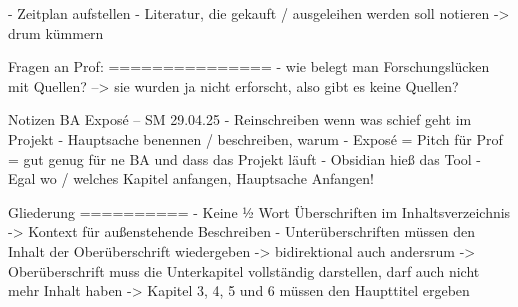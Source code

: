 - Zeitplan aufstellen
- Literatur, die gekauft / ausgeleihen werden soll notieren
  -> drum kümmern


Fragen an Prof:
===============
- wie belegt man Forschungslücken mit Quellen?
  --> sie wurden ja nicht erforscht, also gibt es keine Quellen?


Notizen BA Exposé – SM 29.04.25
-	Reinschreiben wenn was schief geht im Projekt
-	Hauptsache benennen / beschreiben, warum
-	Exposé = Pitch für Prof = gut genug für ne BA und dass das Projekt läuft
-	Obsidian hieß das Tool
-	Egal wo / welches Kapitel anfangen, Hauptsache Anfangen!

Gliederung
==========
-	Keine ½ Wort Überschriften im Inhaltsverzeichnis
    -> Kontext für außenstehende Beschreiben
-	Unterüberschriften müssen den Inhalt der Oberüberschrift wiedergeben
    -> bidirektional auch andersrum
    -> Oberüberschrift muss die Unterkapitel vollständig darstellen, darf auch nicht mehr Inhalt haben
    -> Kapitel 3, 4, 5 und 6 müssen den Haupttitel ergeben


